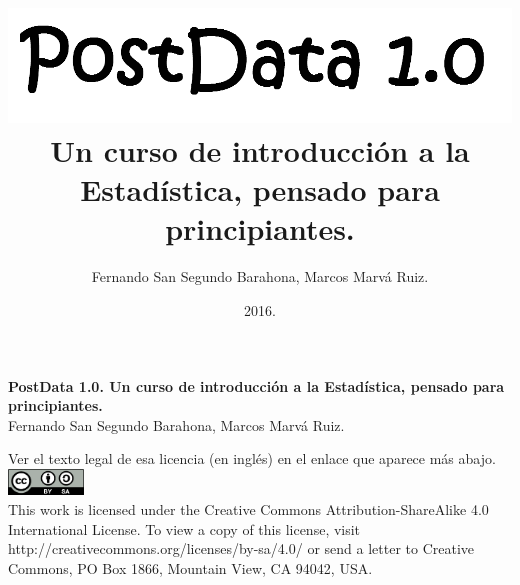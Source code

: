 \documentclass[10pt,a4paper]{book}
\begin{document}
	
	\frontmatter
	
	
	\author{Fernando San Segundo Barahona, Marcos Marvá Ruiz.}
	\title{
		\includegraphics[width=14cm]{../fig/frontispicio.png}\\[5mm]
		{\small
			Un curso de introducción a la Estadística, pensado para principiantes.}
	}
	\date{\small 2016.}
	
	\VerbatimFootnotes
	
	
	\maketitle
	
	\newpage
	
	\thispagestyle{empty}
	
	\small
	\noindent \textbf{PostData 1.0. Un curso de introducción a la Estadística, pensado para principiantes. } \\
	Fernando San Segundo Barahona, Marcos Marvá Ruiz.
	
	\vspace{1cm}
	  Ver el texto legal de esa licencia (en inglés) en el enlace que aparece más abajo.\\
	\noindent\includegraphics[width=2cm]{../fig/by-sa.png}\\
	{%
		\noindent
		This work is licensed under the Creative Commons Attribution-ShareAlike 4.0 International License. To view a copy of this license, visit http://creativecommons.org/licenses/by-sa/4.0/ or send a letter to Creative Commons, PO Box 1866, Mountain View, CA 94042, USA.}
	
\end{document}
